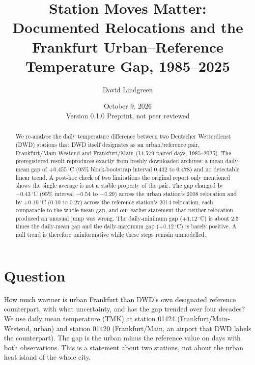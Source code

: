\documentclass[11pt]{article}
\title{Station Moves Matter:\\
Documented Relocations and the Frankfurt Urban--Reference\\
Temperature Gap, 1985--2025}
\author{David Lindgreen}
\date{October 9, 2026 \\[2pt] \small Version 0.1.0 \quad Preprint, not peer reviewed}
\begin{document}
\maketitle

\begin{abstract}
We re-analyse the daily temperature difference between two Deutscher Wetterdienst (DWD) stations that DWD itself
designates as an urban/reference pair, Frankfurt/Main-Westend and Frankfurt/Main (14{,}579 paired days,
1985--2025). The preregistered result reproduces exactly from freshly downloaded archives: a mean daily-mean gap of
$+0.455\,^{\circ}$C (95\% block-bootstrap interval 0.432 to 0.478) and no detectable linear trend. A post-hoc check of two
limitations the original report only mentioned shows the single average is not a stable property of the pair. The
gap changed by $-0.43\,^{\circ}$C (95\% interval $-0.54$ to $-0.29$) across the urban station's 2008 relocation and by
$+0.19\,^{\circ}$C (0.10 to 0.27) across the reference station's 2014 relocation, each comparable to the whole mean
gap, and our earlier statement that neither relocation produced an unusual jump was wrong. The daily-minimum gap
($+1.12\,^{\circ}$C) is about 2.5 times the daily-mean gap and the daily-maximum gap ($+0.12\,^{\circ}$C) is barely
positive. A null trend is therefore uninformative while these steps remain unmodelled.
\end{abstract}

\section{Question}
How much warmer is urban Frankfurt than DWD's own designated reference counterpart, with what uncertainty, and has the
gap trended over four decades? We use daily mean temperature (TMK) at station 01424 (Frankfurt/Main-Westend, urban) and
station 01420 (Frankfurt/Main, an airport that DWD labels the counterpart). The gap is the urban minus the reference value on
days with both observations. This is a statement about two stations, not about the urban heat island of the whole city.
\end{document}
